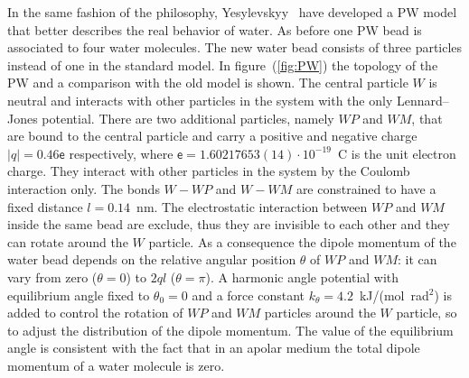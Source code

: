 In the same fashion of the \martini philosophy, Yesylevskyy \etal\, \cite{PW} have developed a \acf{PW} model
that better describes the real behavior of water. As before one \ac{PW} bead is associated to four water
molecules. The new water bead consists of three particles instead of one in the standard \martini model. In
figure~(\ref{fig:PW}) the topology of the \ac{PW} and a comparison with the old model is shown. The central
particle $W$ is neutral and interacts with other particles in the system with the only Lennard--Jones potential.
There are two additional particles, namely $WP$ and $WM$, that are bound to the central particle and carry a
positive and negative charge $|q| = 0.46\mathsf{e}$ respectively, where
$\mathsf{e} = 1.60217653(14) \cdot 10^{-19}$~C is the unit electron charge. They interact with other particles in
the system by the Coulomb interaction only. The bonds $W-WP$ and $W-WM$ are constrained to have a fixed distance
$l = 0.14$~nm. The electrostatic interaction between $WP$ and $WM$ inside the same bead are exclude, thus they
are invisible to each other and they can rotate around the $W$ particle. As a consequence the dipole momentum of
the water bead depends on the relative angular position $\theta$ of $WP$ and $WM$: it can vary from zero
($\theta = 0$) to $2ql$ ($\theta = \pi$). A harmonic angle potential with equilibrium angle fixed to
$\theta_0 = 0$ and a force constant $k_\theta = 4.2$~kJ/(mol\ rad$^2$) is added to control the rotation of
$WP$ and $WM$ particles around the $W$ particle, so to adjust the distribution of the dipole momentum. The value
of the equilibrium angle is consistent with the fact that in an apolar medium the total dipole momentum of a
water molecule is zero.


